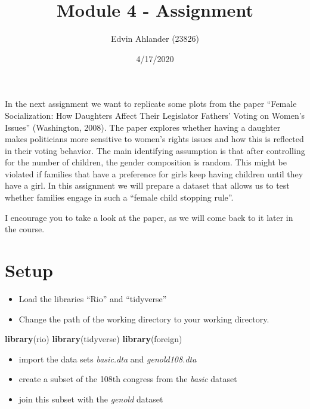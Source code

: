 \documentclass[]{article}
\title{Module 4 - Assignment}
\author{Edvin Ahlander (23826)}
\date{4/17/2020}
\newenvironment{Shaded}{\begin{snugshade}}{\end{snugshade}}
\newcommand{\KeywordTok}[1]{\textcolor[rgb]{0.13,0.29,0.53}{\textbf{#1}}}
\newcommand{\NormalTok}[1]{#1}
\providecommand{\tightlist}{%
  \setlength{\itemsep}{0pt}\setlength{\parskip}{0pt}}
\begin{document}
\maketitle

In the next assignment we want to replicate some plots from the paper
``Female Socialization: How Daughters Affect Their Legislator Fathers'
Voting on Women's Issues'' (Washington, 2008). The paper explores
whether having a daughter makes politicians more sensitive to women's
rights issues and how this is reflected in their voting behavior. The
main identifying assumption is that after controlling for the number of
children, the gender composition is random. This might be violated if
families that have a preference for girls keep having children until
they have a girl. In this assignment we will prepare a dataset that
allows us to test whether families engage in such a ``female child
stopping rule''.

I encourage you to take a look at the paper, as we will come back to it
later in the course.

\section{Setup}\label{setup}

\begin{itemize}
\tightlist
\item
  Load the libraries ``Rio'' and ``tidyverse''
\item
  Change the path of the working directory to your working directory.
\end{itemize}

\begin{Shaded}
\begin{Highlighting}[]
\KeywordTok{library}\NormalTok{(rio)}
\KeywordTok{library}\NormalTok{(tidyverse)}
\KeywordTok{library}\NormalTok{(foreign)}
\end{Highlighting}
\end{Shaded}

\begin{itemize}
\tightlist
\item
  import the data sets \emph{basic.dta} and \emph{genold108.dta}
\item
  create a subset of the 108th congress from the \emph{basic} dataset
\item
  join this subset with the \emph{genold} dataset
\end{itemize}
\end{document}
